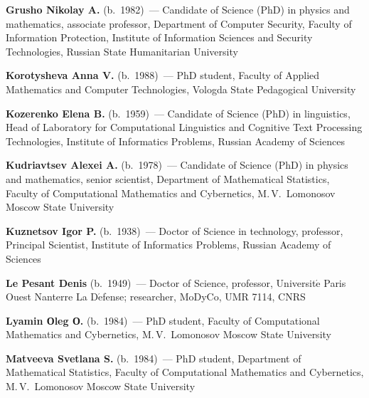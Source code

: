 \begin{multicols}{2}
\vspace*{3pt}

\noindent
\textbf{Grusho Nikolay A.} (b.\ 1982)~--- Candidate of Science (PhD) in physics and mathematics, 
associate professor, Department of Computer Security, Faculty of Information Protection, 
Institute of Information Sciences and Security Technologies, Russian State Humanitarian University

\vspace*{3pt}

\noindent
\textbf{Korotysheva Anna V.} (b.\ 1988)~--- PhD student, Faculty of Applied
Mathematics and Computer Technologies, Vologda State Pedagogical University


\vspace*{3pt}

\noindent
\textbf{Kozerenko Elena B.} (b.\ 1959)~--- Candidate of Science (PhD) in linguistics, 
Head of Laboratory for Computational Linguistics and Cognitive Text Processing Technologies, 
Institute of Informatics Problems, Russian Academy of Sciences  

\columnbreak

\noindent
\textbf{Kudriavtsev Alexei A.} (b.\ 1978)~--- Candidate of Science (PhD) in physics and mathematics, 
senior scientist, Department of Mathematical Statistics, Faculty of Computational Mathematics and Cybernetics, 
M.\,V.~Lomonosov Moscow State University

\vspace*{3pt}

\noindent
\textbf{Kuznetsov Igor P.} (b.\ 1938)~--- Doctor of Science in technology, professor, Principal Scientist, 
Institute of Informatics Problems, Russian Academy of Sciences

\vspace*{3pt}

\noindent
\textbf{Le Pesant Denis} (b.\ 1949)~--- Doctor of Science, professor, Universit$\acute{\mbox{e}}$ 
Paris Ouest Nanterre La D$\acute{\mbox{e}}$fense; researcher, MoDyCo, UMR 7114, CNRS

\vspace*{3pt}

\noindent
\textbf{Lyamin Оleg О.} (b.\ 1984)~--- PhD student, Faculty of Computational Mathematics and Cybernetics, 
M.\,V.~Lomonosov Moscow State University

\vspace*{3pt}

\noindent
\textbf{Matveeva Svetlana S.} (b.\ 1984)~--- PhD student, 
Department of Mathematical Statistics, 
Faculty of Computational Mathematics and Cybernetics, M.\,V.~Lomonosov Moscow State University


\end{multicols}
